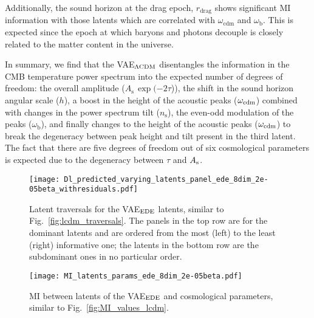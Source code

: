 \documentclass[aps, prd, reprint, superscriptaddress, nofootinbib, bibnotes]{revtex4-2}
\begin{document}
%
Additionally, the sound horizon at the drag epoch, $r_\mathrm{drag}$ shows significant MI information with those latents which are correlated with $\omega_\mathrm{cdm}$ and $\omega_\mathrm{b}$. This is expected since the epoch at which baryons and photons decouple is closely related to the matter content in the universe.

In summary, we find that the VAE$_{\Lambda \rm CDM}$ disentangles the information in the CMB temperature power spectrum into the expected number of degrees of freedom: the overall amplitude ($A_\mathrm{s}\, \exp({-2\tau}$)), the shift in the sound horizon angular scale ($h$), a boost in the height of the acoustic peaks ($\omega_{\rm cdm}$) combined with changes in the power spectrum tilt ($n_\mathrm{s}$), the even-odd modulation of the peaks ($\omega_\mathrm{b}$), and finally changes to the height of the acoustic peaks ($\omega_{\rm cdm}$) to break the degeneracy between peak height and tilt present in the third latent. 
The fact that there are five degrees of freedom out of six cosmological parameters is expected due to the degeneracy between $\tau$ and $A_{\rm s}$.

\begin{figure*}
    \centering
    \texttt{[image: Dl\_predicted\_varying\_latents\_panel\_ede\_8dim\_2e-05beta\_withresiduals.pdf]}
    \vspace{-0.4cm}
    \caption{Latent traversals for the VAE$_{\rm {EDE}}$ latents, similar to Fig.~\ref{fig:lcdm_traversals}. The panels in the top row are for the dominant latents and are ordered from the most (left) to the least (right) informative one; the latents in the bottom row are the subdominant ones in no particular order.}
    \label{fig:ede_traversals}
\end{figure*}

\begin{figure}
\centering
\texttt{[image: MI\_latents\_params\_ede\_8dim\_2e-05beta.pdf]}
\vspace{-0.4cm}
\caption{MI between latents of the VAE$_{\rm {EDE}}$ and cosmological parameters, similar to Fig.~\ref{fig:MI_values_lcdm}.}
\label{fig:MI_values_ede}
\end{figure}
\end{document}
